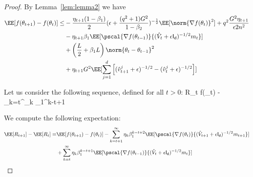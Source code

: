\documentclass[11pt]{article}
\begin{document}
\begin{proof}


By Lemma~\ref{lem:lemma2} we have 
\begin{equation}
\begin{split}
\EE[f(\theta_{t+1}) - f(\theta_{t}) ] \leq &   - \frac{\eta_{t+1}(1-\beta_1)}{2}  (\epsilon + \frac{(q^2+1)G^2}{1 - \beta_2})^{-\frac{1}{2}} \EE[\norm{\nabla f(\theta_t)}^2] +q^2 \frac{G^2 \eta_{t+1}}{\epsilon 2n^2} \\
&- \eta_{t+1} \beta_1\EE[\pscal{\nabla f(\theta_{t-1})}{(\hat{V}_{t} + \epsilon \mathsf{I_d})^{-1/2} m_{t}}]\\
& +  \left(\frac{L}{2} + \beta_1 L \right) \norm{\theta_t - \theta_{t-1}}^2\\
&+   \eta_{t+1} G^2 \EE[\sum_{j=1}^d \left[(\hat{v}^j_{t+1} + \epsilon )^{-1/2} - (\hat{v}^j_{t} + \epsilon )^{-1/2}  \right] ]
\end{split}
\end{equation}

Let us consider the following sequence, defined for all $t >0$:
\beq\label{eq:defR}
R_t \eqdef f(\theta_{t}) - \sum_{k=t}^\infty \eta_{k} \beta_1^{k-t+1}
\eeq

We compute the following expectation:
\begin{equation}
\begin{split}
\EE[R_{t+1}] - \EE[R_t] =& \EE[f(\theta_{t+1}) - f(\theta_{t}) ]  -  \sum_{k=t+1}^\infty \eta_{k} \beta_1^{k-t+2}\EE[\pscal{\nabla f(\theta_{t})}{(\hat{V}_{t+1} + \epsilon \mathsf{I_d})^{-1/2} m_{t+1}}] \\
& +  \sum_{k=t}^\infty \eta_{k} \beta_1^{k-t+1}\EE[\pscal{\nabla f(\theta_{t-1})}{(\hat{V}_{t} + \epsilon \mathsf{I_d})^{-1/2} m_{t}}]\\
\end{split}
\end{equation}


\end{proof}
\end{document}

